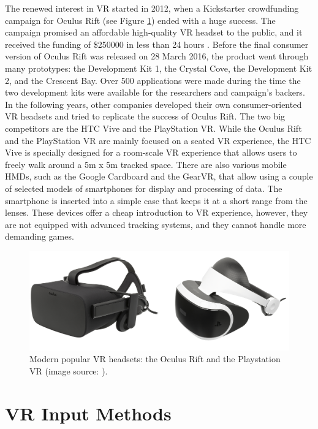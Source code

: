 The renewed interest in VR started in 2012, when a Kickstarter crowdfunding campaign for Oculus Rift (see Figure \ref{fig:CONTROLLERS}) ended with a huge success. The campaign promised an affordable high-quality VR headset to the public, and it received the funding of \$250000 in less than 24 hours \cite{VR_TECHNOLOGY}. Before the final consumer version of Oculus Rift was released on 28 March 2016, the product went through many prototypes: the Development Kit 1, the Crystal Cove, the Development Kit 2, and the Crescent Bay. Over 500 applications were made during the time the two development kits were available for the researchers and campaign's backers. In the following years, other companies developed their own consumer-oriented VR headsets and tried to replicate the success of Oculus Rift. The two big competitors are the HTC Vive and the PlayStation VR. While the Oculus Rift and the PlayStation VR are mainly focused on a seated VR experience, the HTC Vive is specially designed for a room-scale VR experience that allows users to freely walk around a 5m x 5m tracked space. There are also various mobile HMDs, such as the Google Cardboard and the GearVR, that allow using a couple of selected models of smartphones for display and processing of data. The smartphone is inserted into a simple case that keeps it at a short range from the lenses. These devices offer a cheap introduction to VR experience, however, they are not equipped with advanced tracking systems, and they cannot handle more demanding games.

\begin{figure}[th]
\centering
\includegraphics[width=1\textwidth]{img/headsets.png}
\caption{Modern popular VR headsets: the Oculus Rift and the Playstation VR (image source: \cite{OCULUS_HEADSET}\cite{PSVR_HEADSET}).}
\label{fig:CONTROLLERS}
\end{figure}

\section{VR Input Methods}

